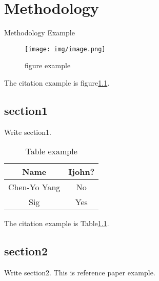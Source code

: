 \chapter{Methodology}

Methodology Example 
\begin{figure}[H]
\centering
\texttt{[image: img/image.png]}
\caption{figure example}
\label{fig:1}
\end{figure}


The citation example is figure\ref{fig:1}.

\section{section1}
Write section1.

\begin{table}[h]
    \centering
    \begin{tabular}[l]{|c|c|}
    \hline
    Name & Ijohn? \\
    \hline
    Chen-Yo Yang & No  \\
    \hline
    Sig & Yes \\
    \hline
    \end{tabular}
    \caption{Table example}\label{CiteLable}  
\end{table}

The citation example is Table\ref{CiteLable}.

\section{section2}
Write section2.
This is reference paper example\cite{1}.
